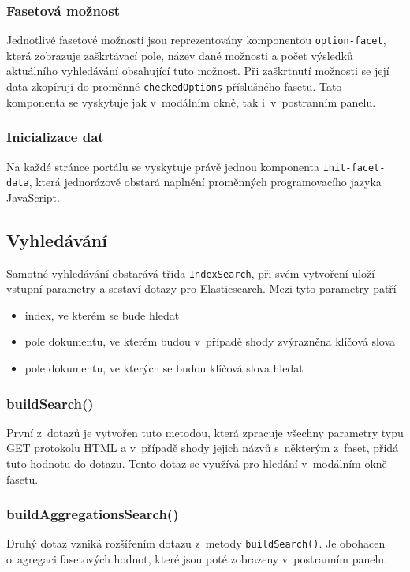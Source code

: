 \subsubsection*{Fasetová možnost}
Jednotlivé fasetové možnosti jsou reprezentovány komponentou \texttt{option-facet}, která zobrazuje zaškrtávací pole, název dané možnosti a počet výsledků aktuálního vyhledávání obsahující tuto možnost. Při zaškrtnutí možnosti se její data zkopírují do proměnné \texttt{checkedOptions} příslušného fasetu. Tato komponenta se vyskytuje jak v~modálním okně, tak i~v~postranním panelu.

\subsubsection*{Inicializace dat}
Na každé stránce portálu se vyskytuje právě jednou komponenta \texttt{init-facet-data}, která jednorázově obstará naplnění proměnných programovacího jazyka JavaScript.

\subsection{Vyhledávání}
Samotné vyhledávání obstarává třída \texttt{IndexSearch}, při svém vytvoření uloží vstupní parametry a sestaví dotazy pro Elasticsearch. Mezi tyto parametry patří
\begin{itemize}
    \item index, ve kterém se bude hledat
    \item pole dokumentu, ve kterém budou v~případě shody zvýrazněna klíčová slova
    \item pole dokumentu, ve kterých se budou klíčová slova hledat
\end{itemize}
\subsubsection*{buildSearch()}
První z~dotazů je vytvořen tuto metodou, která zpracuje všechny parametry typu GET protokolu HTML a v~případě shody jejich názvů s~některým z~faset, přidá tuto hodnotu do dotazu. Tento dotaz se využívá pro hledání v~modálním okně fasetu. 

\subsubsection*{buildAggregationsSearch()}
Druhý dotaz vzniká rozšířením dotazu z~metody \texttt{buildSearch()}. Je obohacen o~agregaci fasetových hodnot, které jsou poté zobrazeny v~postranním panelu.

